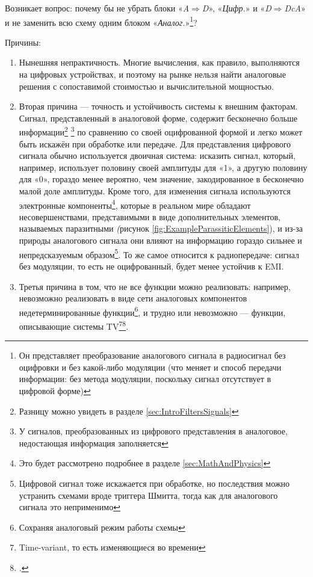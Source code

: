 \documentclass[a4paper, 10pt, final]{article} %
\newcommand{\parenciteit}[2]{\textit{\parencite[#1]{#2}}} %
\begin{document}
    \noindent Возникает вопрос: почему бы не убрать блоки «\emph{A$\Rightarrow$D}», «\emph{Цифр.}» и «\emph{D$\Rightarrow$DcA}» и не заменить всю схему одним блоком «\emph{Аналог.}»\footnote{Он представляет преобразование аналогового сигнала в радиосигнал без оцифровки и без какой-либо модуляции (что меняет и способ передачи информации: без метода модуляции, поскольку сигнал отсутствует в цифровой форме)}?

    \nopagebreak
    \noindent Причины:
    \begin{enumerate}[label=\emph{(\arabic*)}]
        \item Нынешняя непрактичность.
        Многие вычисления, как правило, выполняются на цифровых устройствах, и поэтому на рынке нельзя найти аналоговые решения с сопоставимой стоимостью и вычислительной мощностью.
        \item Вторая причина --- точность и устойчивость системы к внешним факторам.
        Сигнал, представленный в аналоговой форме, содержит бесконечно больше информации\footnote{Разницу можно увидеть в разделе \ref{sec:IntroFiltersSignals}} \footnote{У сигналов, преобразованных из цифрового представления в аналоговое, недостающая информация заполняется} по сравнению со своей оцифрованной формой и легко может быть искажён при обработке или передаче.
        Для представления цифрового сигнала обычно используется двоичная система: исказить сигнал, который, например, использует половину своей амплитуды для «1», а другую половину для «0», гораздо менее вероятно, чем значение, закодированное в бесконечно малой доле амплитуды.
        Кроме того, для изменения сигнала используются электронные компоненты\footnote{Это будет рассмотрено подробнее в разделе \ref{sec:MathAndPhysics}}, которые в реальном мире обладают несовершенствами, представимыми в виде дополнительных элементов, называемых паразитными \emph(рисунок \ref{fig:ExampleParassiticElements}), и из-за природы аналогового сигнала они влияют на информацию гораздо сильнее и непредсказуемым образом\footnote{Цифровой сигнал тоже искажается при обработке, но последствия можно устранить схемами вроде триггера Шмитта\parenciteit{}{SchmittTrigger:Wiki}, тогда как для аналогового сигнала это неприменимо}.
        То же самое относится к радиопередаче: сигнал без модуляции, то есть не оцифрованный, будет менее устойчив к EMI.
        \item Третья причина в том, что не все функции можно реализовать: например, невозможно реализовать в виде сети аналоговых компонентов недетерминированные функции\footnote{Сохраняя аналоговый режим работы схемы}, и трудно или невозможно --- функции, описывающие системы TV\footnote{Time-variant, то есть изменяющиеся во времени}\:\footcite[]{TimeVariantSystem:Wiki}.
    \end{enumerate}
\end{document}
